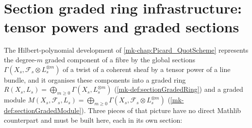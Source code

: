 \section{Section graded ring infrastructure: tensor powers and graded sections}
\label{mk-chap:Picard_SectionGradedRing}

\providecommand{\PshMod}{\mathrm{PresheafOfModules}}
\providecommand{\ShMod}{\mathrm{SheafOfModules}}
\providecommand{\Modules}{\mathrm{Modules}}

The Hilbert-polynomial development of \ref{mk-chap:Picard_QuotScheme} represents the
degree-\(m\) graded component of a fibre by the global sections
\(\Gamma(X_s, \mathcal{F}_s \otimes L_s^{\otimes m})\) of a twist of a coherent
sheaf by a tensor power of a line bundle, and it organises these components into
a graded ring \(R(X_s, L_s) = \bigoplus_{m \ge 0} \Gamma(X_s, L_s^{\otimes m})\)
(\ref{mk-def:sectionGradedRing}) and a graded module
\(M(X_s, \mathcal{F}_s, L_s) = \bigoplus_{m \ge 0}
\Gamma(X_s, \mathcal{F}_s \otimes L_s^{\otimes m})\)
(\ref{mk-def:sectionGradedModule}). Three pieces of that picture have no direct
Mathlib counterpart and must be built here, each in its own section:

